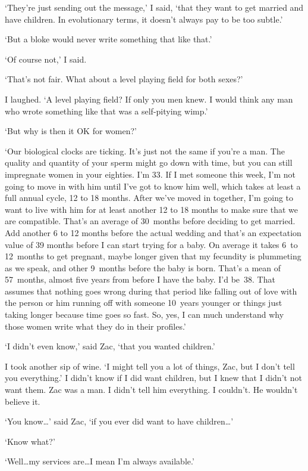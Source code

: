 `They're just sending out the message,' I said, `that they want to
get married and have children. In evolutionary terms, it doesn't
always pay to be too subtle.'

`But a bloke would never write something that like that.'

`Of course not,' I said.

`That's not fair. What about a level playing field for both sexes?'

I laughed. `A level playing field? If only you men knew. I would think
any man who wrote something like that was a self-pitying wimp.'

`But why is then it OK for women?'

`Our biological clocks are ticking. It's just not the same if you're
a man. The quality and quantity of your sperm might go down with
time, but you can still impregnate women in your eighties. I'm 33.
If I met someone this week, I'm not going to move in with him until
I've got to know him well, which takes at least a full annual cycle,
12 to 18 months. After we've moved in together, I'm going to want to
live with him for at least another 12 to 18 months to make sure that
we are compatible. That's an average of 30~months before deciding to
get married. Add another 6 to 12 months before the actual wedding
and that's an expectation value of 39 months before I can start
trying for a baby. On average it takes 6~to 12~months to get
pregnant, maybe longer given that my fecundity is plummeting as we
speak, and other 9~months before the baby is born. That's a mean of
57~months, almost five years from before I have the baby. I'd
be~38. That assumes that nothing goes wrong during that period like
falling out of love with the person or him running off with someone
10~years younger or things just taking longer because time goes so fast. So, yes, I can much understand why those women
write what they do in their profiles.'

`I didn't even know,' said Zac, `that you wanted children.'

I took another sip of wine. `I might tell you a lot of things, Zac,
but I don't tell you everything.' I didn't know if I did want
children, but I knew that I didn't {\twelveit not\/} want them. Zac was a man. I
didn't tell him everything. I couldn't. He wouldn't believe it.

`You know\dots' said Zac, `if you ever did want to have
children\dots'

`Know what?'

`Well\dots my services are\dots I mean I'm always available.'

